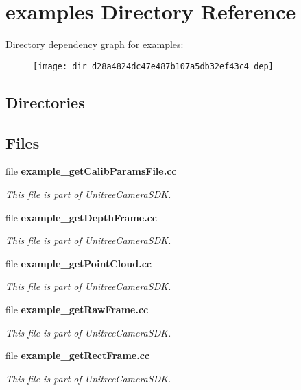 \section{examples Directory Reference}
\label{dir_d28a4824dc47e487b107a5db32ef43c4}
Directory dependency graph for examples\+:\nopagebreak
\begin{figure}[H]
\begin{center}
\leavevmode
\texttt{[image: dir\_d28a4824dc47e487b107a5db32ef43c4\_dep]}
\end{center}
\end{figure}
\subsection*{Directories}
\begin{DoxyCompactItemize}
\end{DoxyCompactItemize}
\subsection*{Files}
\begin{DoxyCompactItemize}
\item 
file \textbf{ example\+\_\+get\+Calib\+Params\+File.\+cc}
\begin{DoxyCompactList}\small\item\em This file is part of Unitree\+Camera\+S\+DK. \end{DoxyCompactList}\item 
file \textbf{ example\+\_\+get\+Depth\+Frame.\+cc}
\begin{DoxyCompactList}\small\item\em This file is part of Unitree\+Camera\+S\+DK. \end{DoxyCompactList}\item 
file \textbf{ example\+\_\+get\+Point\+Cloud.\+cc}
\begin{DoxyCompactList}\small\item\em This file is part of Unitree\+Camera\+S\+DK. \end{DoxyCompactList}\item 
file \textbf{ example\+\_\+get\+Raw\+Frame.\+cc}
\begin{DoxyCompactList}\small\item\em This file is part of Unitree\+Camera\+S\+DK. \end{DoxyCompactList}\item 
file \textbf{ example\+\_\+get\+Rect\+Frame.\+cc}
\begin{DoxyCompactList}\small\item\em This file is part of Unitree\+Camera\+S\+DK. \end{DoxyCompactList}\end{DoxyCompactItemize}
